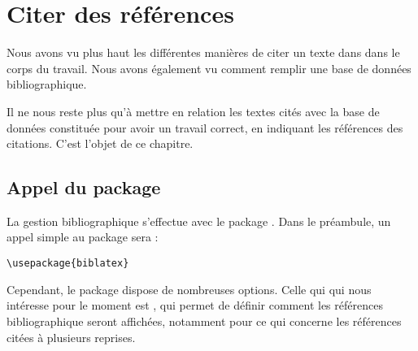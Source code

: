 \chapter{Citer des références}

\begin{prealable}
Nous avons vu plus haut les différentes manières de citer un texte dans  dans le corps du travail. Nous avons également vu comment remplir une base de données bibliographique.

Il ne nous reste plus qu'à mettre en relation les textes cités avec la base de données constituée pour avoir un travail correct, en indiquant les références des citations. C'est l'objet de ce chapitre.

\end{prealable}


\section[Appel du package]{Appel du package }

La gestion bibliographique s'effectue avec le package . Dans le préambule, un appel simple au package sera :

\begin{verbatim}
\usepackage{biblatex}
\end{verbatim}

Cependant, le package dispose de nombreuses options. Celle qui qui nous intéresse pour le moment est , qui permet de définir comment les références bibliographique seront affichées, notamment pour ce qui concerne les références citées à plusieurs reprises.

